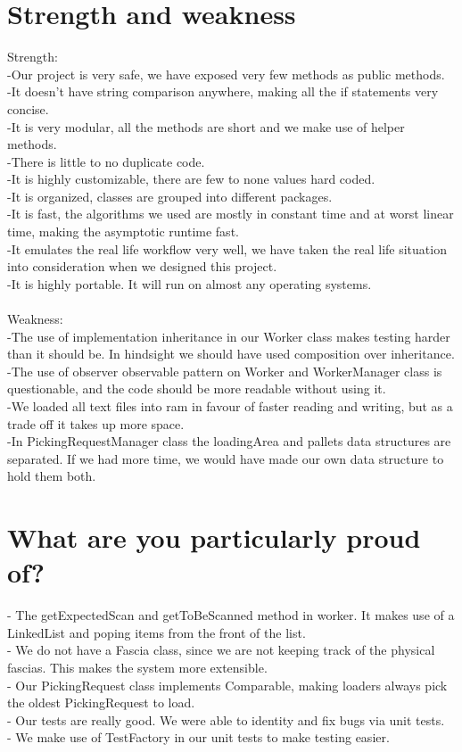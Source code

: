 \documentclass[12pt]{article}
\begin{document}
\section*{Strength and weakness}
Strength:\\
-Our project is very safe, we have exposed very few methods as public methods.\\
-It doesn't have string comparison anywhere, making all the if statements very \\concise.\\
-It is very modular, all the methods are short and we make use of helper methods.\\
-There is little to no duplicate code.\\
-It is highly customizable, there are few to none values hard coded.\\
-It is organized, classes are grouped into different packages.\\
-It is fast, the algorithms we used are mostly in constant time and at worst linear time, making the asymptotic runtime fast.\\ 
-It emulates the real life workflow very well, we have taken the real life situation into consideration when we designed this project.\\
-It is highly portable. It will run on almost any operating systems. \\
\hfill\\
Weakness:\\
-The use of implementation inheritance in our Worker class makes testing harder than it should be. In hindsight we should have used composition over inheritance.\\
-The use of observer observable pattern on Worker and WorkerManager class is questionable, and the code should be more readable without using it.\\
-We loaded all text files into ram in favour of faster reading and writing, but as a trade off it takes up more space.\\
-In PickingRequestManager class the loadingArea and pallets data structures are separated. If we had more time, we would have made our own data structure to hold them both.\\
\pagebreak
\section*{What are you particularly proud of?}
- The getExpectedScan and getToBeScanned method in worker. It makes use of a LinkedList and poping items from the front of the list.\\
- We do not have a Fascia class, since we are not keeping track of the physical fascias. This makes the system more extensible.\\
- Our PickingRequest class implements Comparable, making loaders always pick the oldest PickingRequest to load.\\
- Our tests are really good. We were able to identity and fix bugs via unit tests.\\
- We make use of TestFactory in our unit tests to make testing easier.
\pagebreak
\end{document}
